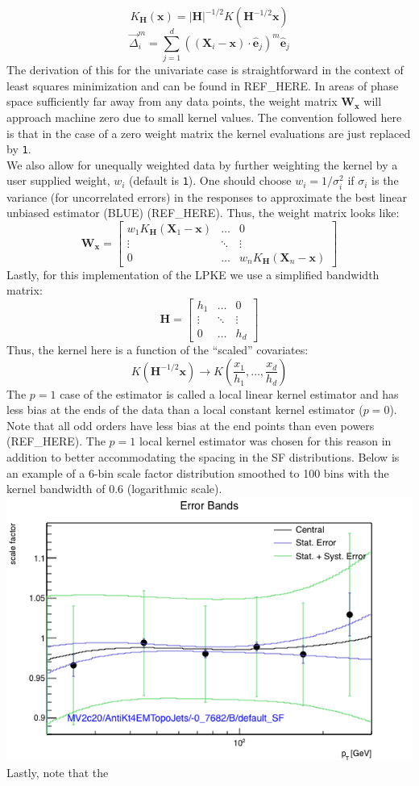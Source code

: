 \[
K_{\mathbf{H}}(\mathbf{x})=\left|\mathbf{H}\right|^{-1/2}
K(\mathbf{H}^{-1/2}\mathbf{x})
\] \[
\overrightarrow{\Delta}^m_i=\sum^d_{j=1}
\left(\left(\mathbf{X}_i-\mathbf{x}\right)\cdot\hat{\mathbf{e}}_j\right)^m
\hat{\mathbf{e}}_j
\] The derivation of this for the univariate case is straightforward in
the context of least squares minimization and can be found in REF\_HERE.
In areas of phase space sufficiently far away from any data points, the
weight matrix $\mathbf{W}_{\mathbf{x}}$ will approach machine zero due
to small kernel values. The convention followed here is that in the case
of a zero weight matrix the kernel evaluations are just replaced by
\texttt{1}.\\We also allow for unequally weighted data by further
weighting the kernel by a user supplied weight, $w_i$ (default is
\texttt{1}). One should choose $w_i=1/\sigma_i^2$ if $\sigma_i$ is the
variance (for uncorrelated errors) in the responses to approximate the
best linear unbiased estimator (BLUE) (REF\_HERE). Thus, the weight
matrix looks like: \[
\mathbf{W}_{\mathbf{x}}=
\begin{bmatrix}
w_1 K_{\mathbf{H}}(\mathbf{X}_1-\mathbf{x}) &  \ldots & 0\\
\vdots  &  \ddots & \vdots\\
0  &\ldots & w_n K_{\mathbf{H}}(\mathbf{X}_n-\mathbf{x})
\end{bmatrix}
\] Lastly, for this implementation of the LPKE we use a simplified
bandwidth matrix: \[
\mathbf{H}=
\begin{bmatrix}
h_1 &  \ldots & 0\\
\vdots  &  \ddots & \vdots\\
0  &\ldots & h_d
\end{bmatrix}
\] Thus, the kernel here is a function of the ``scaled'' covariates: \[
K(\mathbf{H}^{-1/2}\mathbf{x})\rightarrow
K\left(\frac{x_1}{h_1},\ldots,\frac{x_d}{h_d}\right)
\] The $p=1$ case of the estimator is called a local linear kernel
estimator and has less bias at the ends of the data than a local
constant kernel estimator ($p=0$). Note that all odd orders have less
bias at the end points than even powers (REF\_HERE). The $p=1$ local
kernel estimator was chosen for this reason in addition to better
accommodating the spacing in the SF distributions. Below is an example
of a 6-bin scale factor distribution smoothed to 100 bins with the
kernel bandwidth of 0.6 (logarithmic
scale).\\\includegraphics{media/smoothed_SF.png} Lastly, note that the
